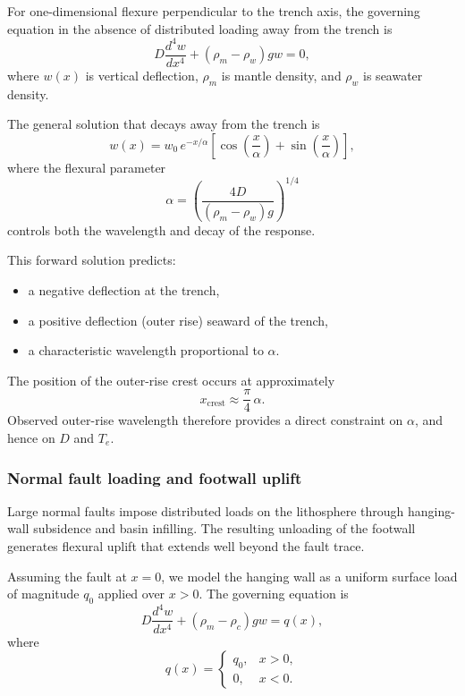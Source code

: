 For one-dimensional flexure perpendicular to the trench axis, the governing equation in the absence of distributed loading away from the trench is
\begin{equation}
D \frac{d^4 w}{dx^4} + (\rho_m - \rho_w) g w = 0,
\end{equation}
where \(w(x)\) is vertical deflection, \(\rho_m\) is mantle density, and \(\rho_w\) is seawater density.

The general solution that decays away from the trench is
\begin{equation}
w(x) = w_0 \, e^{-x/\alpha}
\left[
\cos\!\left(\frac{x}{\alpha}\right)
+
\sin\!\left(\frac{x}{\alpha}\right)
\right],
\end{equation}
where the flexural parameter
\begin{equation}
\alpha = \left( \frac{4D}{(\rho_m - \rho_w) g} \right)^{1/4}
\label{eq:flexural_parameter}
\end{equation}
controls both the wavelength and decay of the response.

This forward solution predicts:
\begin{itemize}
  \item a negative deflection at the trench,
  \item a positive deflection (outer rise) seaward of the trench,
  \item a characteristic wavelength proportional to \( \alpha \).
\end{itemize}

The position of the outer-rise crest occurs at approximately
\begin{equation}
x_{\mathrm{crest}} \approx \frac{\pi}{4}\,\alpha.
\end{equation}
Observed outer-rise wavelength therefore provides a direct constraint on \( \alpha \), and hence on \( D \) and \(T_e\).

\subsubsection{Normal fault loading and footwall uplift}

Large normal faults impose distributed loads on the lithosphere through hanging-wall subsidence and basin infilling. The resulting unloading of the footwall generates flexural uplift that extends well beyond the fault trace.

Assuming the fault at \(x=0\), we model the hanging wall as a uniform surface load of magnitude \(q_0\) applied over \(x>0\). The governing equation is
\begin{equation}
D \frac{d^4 w}{dx^4} + (\rho_m - \rho_c) g w = q(x),
\end{equation}
where
\[
q(x) =
\begin{cases}
q_0, & x > 0, \\
0, & x < 0.
\end{cases}
\]

